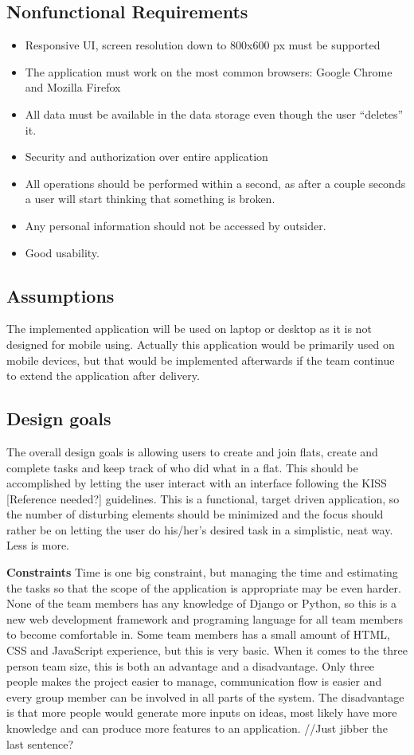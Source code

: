\documentclass{sig-alt-release2}
\begin{document}
\subsection{Nonfunctional Requirements}
\begin{itemize}
\item Responsive UI, screen resolution down to 800x600 px must be supported
\item The application must work on the most common browsers: Google Chrome and Mozilla Firefox 
\item All data must be available in the data storage even though the user {“}deletes{”} it.
\item Security and authorization over entire application
\item All operations should be performed within a second, as after a couple seconds a user will start thinking that something is broken.
\item Any personal information should not be accessed by outsider.
\item Good usability.
\end{itemize}

\subsection{Assumptions}

The implemented application will be used on laptop or desktop as it is not designed for mobile using. Actually this application would be primarily used on mobile devices, but that would be implemented afterwards if the team continue to extend the application after delivery. 

\subsection{Design goals}

The overall design goals is allowing users to create and join flats, create and complete tasks and keep track of who did what in a flat. This should be accomplished by letting the user interact with an interface following the KISS [Reference needed?] guidelines. This is a functional, target driven application, so the number of disturbing elements should be minimized and the focus should rather be on letting the user do his/her’s desired task in a simplistic, neat way. Less is more. 

\textbf{Constraints}
Time is one big constraint, but managing the time and estimating the tasks so that the scope of the application is appropriate may be even harder. None of the team members has any knowledge of Django or Python, so this is a new web development framework and programing language for all team members to become comfortable in. Some team members has a small amount of HTML, CSS and JavaScript experience, but this is very basic. When it comes to the three person team size, this is both an advantage and a disadvantage. Only three people makes the project easier to manage, communication flow is easier and every group member can be involved in all parts of the system. The disadvantage is that more people would generate more inputs on ideas, most likely have more knowledge and can produce more features to an application. //Just jibber the last sentence? 
\end{document}
